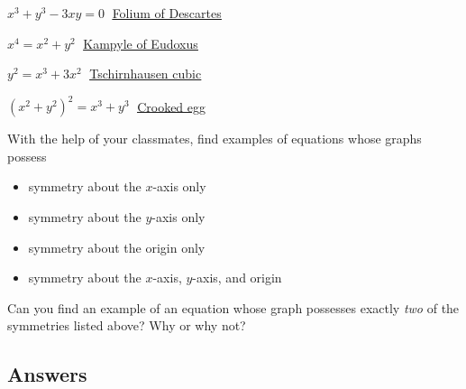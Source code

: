 \begin{exenum}
\item \label{listofcurvesfirst} $x^{3} + y^{3} - 3xy = 0\;$ \href{http://en.wikipedia.org/wiki/Folium_of_descartes}{\underline{Folium of Descartes}}
\item $x^{4} = x^{2} + y^{2}\;$ \href{http://en.wikipedia.org/wiki/Kampyle_of_Eudoxus}{\underline{Kampyle of Eudoxus}}

\item $y^{2} = x^{3} + 3x^{2}\;$ \href{http://en.wikipedia.org/wiki/Tschirnhausen_cubic}{\underline{Tschirnhausen cubic}}
\item \label{listofcurveslast} $(x^{2} + y^{2})^{2} = x^{3} + y^{3}\;$ \href{https://en.wikipedia.org/wiki/File:Crooked_egg_curve.svg}{\underline{Crooked egg}} 

\item  With the help of your classmates, find examples of equations whose graphs possess 

\begin{itemize}

\item  symmetry about the $x$-axis only

\item  symmetry about the $y$-axis only

\item  symmetry about the origin only

\item  symmetry about the $x$-axis, $y$-axis, and origin

\end{itemize}

Can you find an example of an equation whose graph possesses exactly \textit{two} of the symmetries listed above?  Why or why not?

\end{exenum}

\clearpage
\startexenum

\subsection{Answers}

